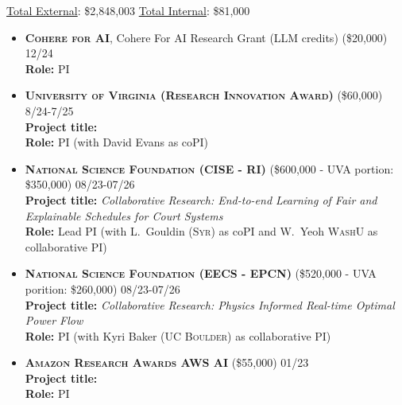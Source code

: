 
\begin{keywords}
{\underline{Total External}: \$2,848,003 %
\hspace{8pt} \underline{Total Internal}: \$81,000}%
\end{keywords}

\begin{itemize}
	\item \textbf{\textsc{Cohere for AI}}, 
	Cohere For AI Research Grant (LLM credits) (\$20,000) \hfill \textsc{12/24}\\
	{\bf Role:} PI

	\item \textbf{\textsc{University of Virginia (Research Innovation Award)}}
	(\$60,000)
	\hfill \textsc{8/24-7/25}\\
	{\bf Project title:} \\
	{\bf Role:} PI (with David Evans as coPI)

	\item 
	\textbf{\textsc{National Science Foundation (CISE - RI)}}
	(\$600,000 - UVA portion: \$350,000)
	\hfill \textsc{08/23-07/26}\\
	{\bf Project title:} 
	{\em Collaborative Research: End-to-end Learning of Fair and Explainable Schedules for Court Systems}\\
	{\bf Role:} Lead PI (with L.~Gouldin (\textsc{Syr}) as coPI and W.~Yeoh \textsc{WashU} as collaborative PI)

	\item
	\textbf{\textsc{National Science Foundation (EECS - EPCN)}}
	(\$520,000 - UVA porition: \$260,000)
	\hfill \textsc{08/23-07/26}\\
	{\bf Project title:} 
	{\em Collaborative Research: Physics Informed Real-time Optimal Power Flow}\\
	{\bf Role:} PI (with Kyri Baker (\textsc{UC Boulder}) as collaborative PI)
	
	\item
	\textbf{\textsc{Amazon Research Awards AWS AI}}
	(\$55,000)
	\hfill\textsc{01/23}\\
	{\bf Project title:} \\
	{\bf Role:} PI


\end{itemize}
